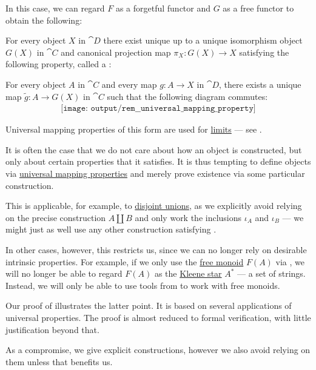 \begin{remark}
  In this case, we can regard \( F \) as a forgetful functor and \( G \) as a free functor to obtain the following:
  \begin{displayquote}
    For every object \( X \) in \( \cat{D} \) there exist unique up to a unique isomorphism object \( G(X) \) in \( \cat{C} \) and canonical projection map \( \pi_X: G(X) \to X \) satisfying the following property, called a :
    \begin{displayquote}
      For every object \( A \) in \( \cat{C} \) and every map \( g: A \to X \) in \( \cat{D} \), there exists a unique map \( \widetilde{g}: A \to G(X) \) in \( \cat{C} \) such that the following diagram commutes:
      \begin{equation}\label{eq:rem:universal_mapping_property/d_triangle_forgetful}
        \begin{aligned}
          \texttt{[image: output/rem\_\_universal\_mapping\_property]}
        \end{aligned}
      \end{equation}
    \end{displayquote}
  \end{displayquote}

  Universal mapping properties of this form are used for \hyperref[def:category_of_cones/limit]{limits} --- see .
\end{remark}

\begin{remark}\label{rem:definition_via_characterization}
  It is often the case that we do not care about how an object is constructed, but only about certain properties that it satisfies. It is thus tempting to define objects via \hyperref[rem:universal_mapping_property]{universal mapping properties} and merely prove existence via some particular construction.

  This is applicable, for example, to \hyperref[def:disjoint_union]{disjoint unions}, as we explicitly avoid relying on the precise construction \( A \amalg B \) and only work the inclusions \( \iota_A \) and \( \iota_B \) --- we might just as well use any other construction satisfying .

  In other cases, however, this restricts us, since we can no longer rely on desirable intrinsic properties. For example, if we only use the \hyperref[def:free_monoid]{free monoid} \( F(A) \) via , we will no longer be able to regard \( F(A) \) as the \hyperref[def:formal_language/kleene_star]{Kleene star} \( A^* \) --- a set of strings. Instead, we will only be able to use tools from  to work with free monoids.

  Our proof of  illustrates the latter point. It is based on several applications of universal properties. The proof is almost reduced to formal verification, with little justification beyond that.

  As a compromise, we give explicit constructions, however we also avoid relying on them unless that benefits us.
\end{remark}

